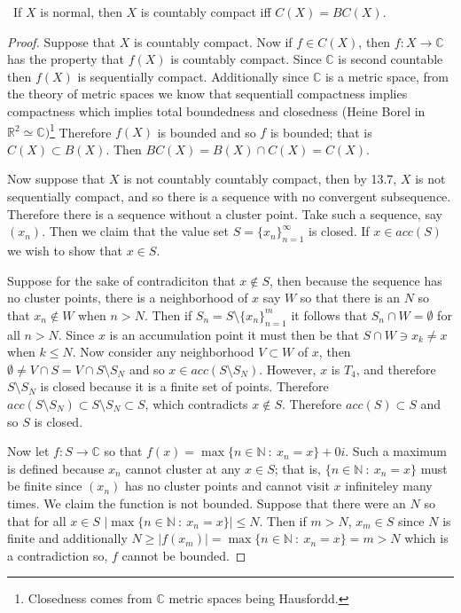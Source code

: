 \documentclass[11pt]{amsart}
\theoremstyle{definition}
\numberwithin{theorem}{section}
\numberwithin{definition}{section}
\numberwithin{equation}{section}
\begin{document}
\medskip {}\ If $X$ is normal, then $X$ is countably compact iff $C(X) = BC(X).$
\begin{proof}
	Suppose that $X$ is countably compact. Now if $f \in C(X)$, then $f: X \to \mathbb{C}$ has the property that $f(X)$
	is countably compact. Since $\mathbb{C}$ is second countable then $f(X)$ is sequentially compact. Additionally since $\mathbb{C}$ is a metric space, from the theory of metric spaces we know that sequentiall compactness implies compactness which implies total boundedness and closedness (Heine Borel in $\mathbb{R}^2 \simeq \mathbb{C})$\footnote{Closedness comes from $\mathbb{C}$ metric spaces being Hausfordd.} Therefore $f(X)$ is bounded and so $f$ is bounded; that is $C(X) \subset B(X).$ Then $BC(X) = B(X) \cap C(X) = C(X).$

	Now suppose that $X$ is not countably countably compact, then by 13.7, $X$ is not sequentially compact, and 
	so there is a sequence with no convergent subsequence. Therefore there is a sequence without a cluster point.
	Take such a sequence, say $(x_n).$ Then we claim that the value set $S = \{x_n\}_{n=1}^\infty$ is closed. If $x \in acc(S)$ we wish to show that $x \in S$. 

	Suppose for the sake of contradiciton that $x \notin S$, then because the sequence has no cluster points, there is a neighborhood of $x$ say $W$ so that there is an $N$ so that $x_n \notin W$ when $n > N.$ Then if $S_n = S \setminus \{x_{n}\}_{n=1}^m$ it follows that $S_n \cap W = \emptyset$ for all $n > N.$ Since $x$ is an accumulation point it must then be that $S \cap W \ni x_k \neq x$ when $k \leq N.$ Now consider any neighborhood $V \subset W$ of $x$, then $\emptyset \neq V \cap S = V \cap S \setminus S_N$ and so $x \in acc(S \setminus S_N).$ However, $x$ 
	is $T_4$, and therefore $S \setminus S_N$ is  closed because it is a finite set of points. Therefore $acc(S \setminus S_N) \subset S \setminus S_N \subset S$, which contradicts $x \notin S$. Therefore $acc(S) \subset S$ and so $S$ is closed.

	Now let $f : S \to \mathbb{C}$ so that $f(x) = \max \{n \in \mathbb{N}\ :\ x_n = x \} + 0i$. Such a maximum is defined because $x_n$ cannot cluster at any $x \in S$; that is, $\{n \in \mathbb{N}\ :\ x_n = x\}$ must be finite since $(x_n)$ has no cluster points and cannot visit $x$ infiniteley many times. We claim the function is not bounded. Suppose that there were an $N$ so that 
	for all $x \in S$ $|\max \{n \in \mathbb{N}\ :\ x_n = x\}| \leq N$. Then if $m > N$, $x_m \in S$ since $N$ is finite 
	and additionally $N \geq |f(x_m)| = \max \{n \in \mathbb{N}\ :\ x_n = x\} = m > N$ which is a contradiction so, $f$
	cannot be bounded. 


\end{proof}
\end{document}

